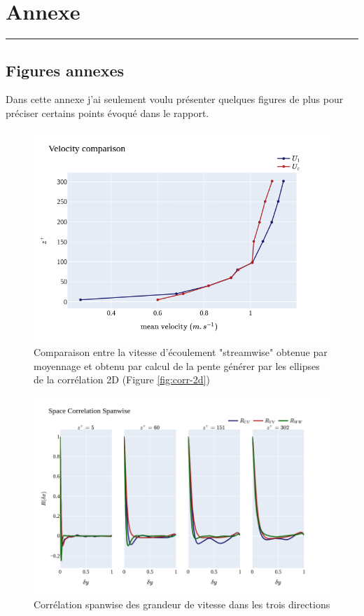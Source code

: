 \documentclass[12pt]{article}
\theoremstyle{plain}
\theoremstyle{remark}
\begin{document}
\pagebreak

\section{Annexe}
\noindent\rule{\linewidth}{2pt}
\vspace{0.1cm}
\subsection{Figures annexes}

Dans cette annexe j'ai seulement voulu présenter quelques figures de plus pour préciser certains points évoqué dans le rapport.

\begin{figure}[H]
	\begin{center}
		\includegraphics[width=0.8\linewidth]{../../output/figures/channel_wrles_retau395/split_time/frozen_turbulence/correlation2D/u_1c_all.png}
		\caption{Comparaison entre la vitesse d'écoulement "streamwise" obtenue par moyennage et obtenu par calcul de la pente générer par les ellipses de la corrélation 2D (Figure \ref{fig:corr-2d})}
		\label{fig:comp_u1_uc}
	\end{center}
\end{figure}

\begin{figure}[H]
	\begin{center}
		\includegraphics[width=0.9\linewidth]{../../output/figures/channel_wrles_retau395/split_time/space_correlation/spanwise.png}
		\caption{Corrélation spanwise des grandeur de vitesse dans les trois directions}
		\label{fig:space_spectra_spanwise}
	\end{center}
\end{figure}
\end{document}
